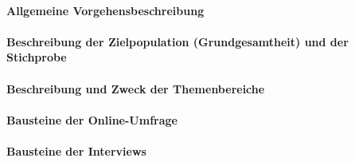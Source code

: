 \documentclass[../../main.tex]{subfiles}
\begin{document}
\paragraph*{Allgemeine Vorgehensbeschreibung}\mbox{}





\paragraph*{Beschreibung der Zielpopulation (Grundgesamtheit) und der Stichprobe}\mbox{}





\paragraph*{Beschreibung und Zweck der Themenbereiche}\mbox{}





\paragraph*{Bausteine der Online-Umfrage}\mbox{}





\paragraph*{Bausteine der Interviews}\mbox{}


\end{document}
